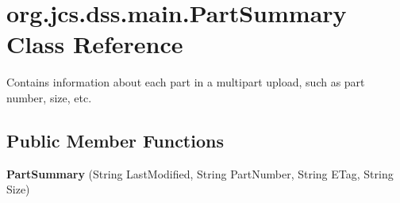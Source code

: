 \hypertarget{classorg_1_1jcs_1_1dss_1_1main_1_1PartSummary}{}\section{org.\+jcs.\+dss.\+main.\+Part\+Summary Class Reference}
\label{classorg_1_1jcs_1_1dss_1_1main_1_1PartSummary}


Contains information about each part in a multipart upload, such as part number, size, etc.  


\subsection*{Public Member Functions}
\begin{DoxyCompactItemize}
\item 
{\bfseries Part\+Summary} (String Last\+Modified, String Part\+Number, String E\+Tag, String Size)\hypertarget{classorg_1_1jcs_1_1dss_1_1main_1_1PartSummary_ac2707032d67ac6f2a9dd7637a0e72473}{}\label{classorg_1_1jcs_1_1dss_1_1main_1_1PartSummary_ac2707032d67ac6f2a9dd7637a0e72473}


\end{DoxyCompactItemize}
